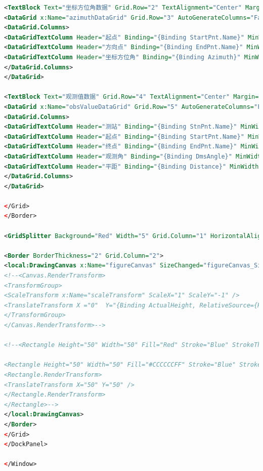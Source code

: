 \begin{lstlisting}[language=xml]
<TextBlock Text="坐标方位角数据" Grid.Row="2" TextAlignment="Center" Margin="2" />
<DataGrid x:Name="azimuthDataGrid" Grid.Row="3" AutoGenerateColumns="False" Margin="2" ItemsSource="{Binding KnownAzimuthes}" >
<DataGrid.Columns>
<DataGridTextColumn Header="起点" Binding="{Binding StartPnt.Name}" MinWidth="60"/>
<DataGridTextColumn Header="方向点" Binding="{Binding EndPnt.Name}" MinWidth="60"/>
<DataGridTextColumn Header="坐标方位角" Binding="{Binding Azimuth}" MinWidth="100" />
</DataGrid.Columns>
</DataGrid>

<TextBlock Text="观测值数据" Grid.Row="4" TextAlignment="Center" Margin="2"/>
<DataGrid x:Name="obsValueDataGrid" Grid.Row="5" AutoGenerateColumns="False"  Margin="2" ItemsSource="{Binding ObsValues}">
<DataGrid.Columns>
<DataGridTextColumn Header="测站" Binding="{Binding StnPnt.Name}" MinWidth="40"/>
<DataGridTextColumn Header="起点" Binding="{Binding StartPnt.Name}" MinWidth="40"/>
<DataGridTextColumn Header="终点" Binding="{Binding EndPnt.Name}" MinWidth="40" />
<DataGridTextColumn Header="观测角" Binding="{Binding DmsAngle}" MinWidth="60"/>
<DataGridTextColumn Header="平距" Binding="{Binding Distance}" MinWidth="60"/>
</DataGrid.Columns>
</DataGrid>

</Grid>
</Border>

<GridSplitter Background="Red" Width="5" Grid.Column="1" HorizontalAlignment="Stretch"/>

<Border BorderThickness="2" Grid.Column="2">
<local:DrawingCanvas x:Name="figureCanvas" SizeChanged="figureCanvas_SizeChanged">
<!--<Canvas.RenderTransform>
<TransformGroup>
<ScaleTransform x:Name="scaleTransform" ScaleX="1" ScaleY="-1" />
<TranslateTransform X ="0"  Y="{Binding ActualHeight, RelativeSource={RelativeSource AncestorType=Canvas}}" />
</TransformGroup>
</Canvas.RenderTransform>-->

<!--<Rectangle Height="50" Width="50" Fill="Red" Stroke="Blue" StrokeThickness="2" Canvas.Left="50" Canvas.Top="50" />

<Rectangle Height="50" Width="50" Fill="#CCCCCCFF" Stroke="Blue" StrokeThickness="2" Canvas.Left="50" Canvas.Top="50" >
<Rectangle.RenderTransform>
<TranslateTransform X="50" Y="50" />
</Rectangle.RenderTransform>
</Rectangle>-->
</local:DrawingCanvas>
</Border>
</Grid>
</DockPanel>

</Window>
 \end{lstlisting}


